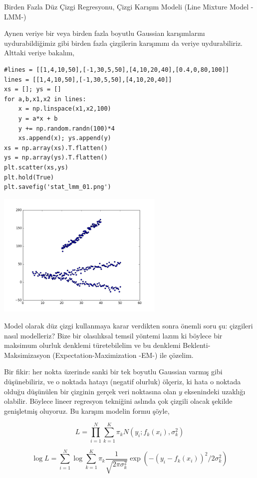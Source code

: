 \documentclass[12pt,fleqn]{article}\usepackage{../../common}
\begin{document}
Birden Fazla Düz Çizgi Regresyonu, Çizgi Karışım Modeli (Line Mixture Model -LMM-)

Aynen veriye bir veya birden fazla boyutlu Gaussian karışımlarını
uydurabildiğimiz gibi birden fazla çizgilerin karışımını da veriye
uydurabiliriz. Alttaki veriye bakalım,

\begin{verbatim}
#lines = [[1,4,10,50],[-1,30,5,50],[4,10,20,40],[0.4,0,80,100]]
lines = [[1,4,10,50],[-1,30,5,50],[4,10,20,40]]
xs = []; ys = []
for a,b,x1,x2 in lines:
    x = np.linspace(x1,x2,100)
    y = a*x + b
    y += np.random.randn(100)*4
    xs.append(x); ys.append(y)
xs = np.array(xs).T.flatten()
ys = np.array(ys).T.flatten()
plt.scatter(xs,ys)
plt.hold(True)
plt.savefig('stat_lmm_01.png')
\end{verbatim}

\includegraphics[height=6cm]{stat_lmm_01.png}

Model olarak düz çizgi kullanmaya karar verdikten sonra önemli soru şu:
çizgileri nasıl modelleriz? Bize bir olasılıksal temsil yöntemi lazım ki
böylece bir maksimum olurluk denklemi türetebilelim ve bu denklemi
Beklenti-Maksimizasyon (Expectation-Maximization -EM-) ile çözelim.

Bir fikir: her nokta üzerinde sanki bir tek boyutlu Gaussian varmış gibi
düşünebiliriz, ve o noktada hatayı (negatif olurluk) ölçeriz, ki hata o
noktada olduğu düşünülen bir çizginin gerçek veri noktasına olan $y$
eksenindeki uzaklığı olabilir. Böylece lineer regresyon tekniğini aslında
çok çizgili olacak şekilde genişletmiş oluyoruz. Bu karışım modelin formu
şöyle,


$$ 
L = \prod_{i=1}^{N} \sum_{k=1}^{K} \pi_k N(y_i; f_k(x_i),\sigma_k^2)
$$

$$ \log L = \sum_{i=1}^{N} \log \sum_{k=1}^{K} \pi_k 
\frac{1}{\sqrt{2\pi\sigma_k^2}} \exp (-(y_i-f_k(x_i))^2 / 2\sigma_k^2)
$$
\end{document}
